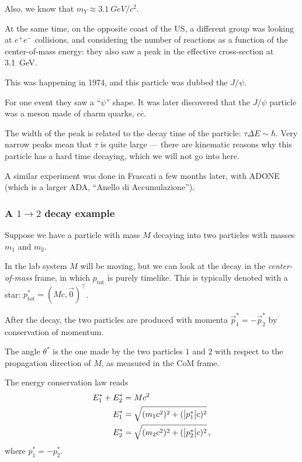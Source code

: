 \documentclass[main.tex]{subfiles}
\begin{document}
Also, we know that \(m_Y \approx \SI{3.1}{GeV} / c^2\). 

At the same time, on the opposite coast of the US, a different group was looking at \(e^{+}e^{-}\) collisions, and considering the number of reactions as a function of the center-of-mass energy: they also saw a peak in the effective cross-section at \SI{3.1}{GeV}. 

This was happening in 1974, and this particle was dubbed the \(J/\psi \). 

For one event they saw a ``\(\psi \)'' shape. 
It was later discovered that the \(J/\psi \) particle was a meson made of charm quarks, \(c \overline{c}\).

The width of the peak is related to the decay time of the particle: \(\tau \Delta E \sim \hbar\). 
Very narrow peaks mean that \(\tau \) is quite large --- there are kinematic reasons why this particle has a hard time decaying, which we will not go into here. 

A similar experiment was done in Frascati a few months later, with ADONE (which is a larger ADA, ``Anello di Accumulazione'').

\subsubsection{A \(1 \to 2\) decay example}

Suppose we have a particle with mass \(M\) decaying into two particles with masses \(m_1 \) and \(m_2 \). 

In the lab system \(M\) will be moving, but we can look at the decay in the \emph{center-of-mass} frame, in which \(p _{\text{tot}}\) is purely timelike. 
This is typically denoted with a star: \(p^{*} _{\text{tot}} = (M c, \vec{0})^{\top}\). 

After the decay, the two particles are produced with momenta \(\vec{p}^{*}_1 = -\vec{p}^{*}_2\) by conservation of momentum. 

The angle \(\theta^{*}\) is the one made by the two particles \(1\) and \(2\) with respect to the propagation direction of \(M\), as measured in the CoM frame. 

The energy conservation law reads  
%
\begin{subequations}
\begin{align}
E^{*}_{1} + E^{*}_{2} &= Mc^2 \\
E^{*}_{1} &= \sqrt{(m_1 c^2)^2 + (\abs{p^{*}_1} c)^2}\\
E^{*}_{2} &= \sqrt{(m_2 c^2)^2 + (\abs{p^{*}_2} c)^2}
\,,
\end{align}
\end{subequations}
%
where \(p^{*}_{1} = - p^{*}_{2}\). 
\end{document}
